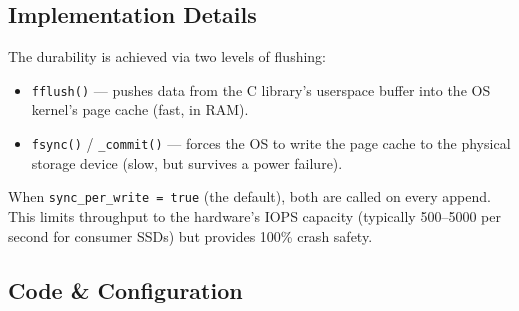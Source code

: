 \documentclass[11pt,a4paper]{article}
\begin{document}
\subsection{Implementation Details}

The durability is achieved via two levels of flushing:
\begin{itemize}[noitemsep]
    \item \texttt{fflush()} --- pushes data from the C library's userspace buffer into the OS kernel's page cache (fast, in RAM).
    \item \texttt{fsync()} / \texttt{\_commit()} --- forces the OS to write the page cache to the physical storage device (slow, but survives a power failure).
\end{itemize}
When \texttt{sync\_per\_write = true} (the default), both are called on every
append. This limits throughput to the hardware's IOPS capacity (typically
500--5000 per second for consumer SSDs) but provides 100\% crash safety.

\subsection{Code \& Configuration}
\end{document}
